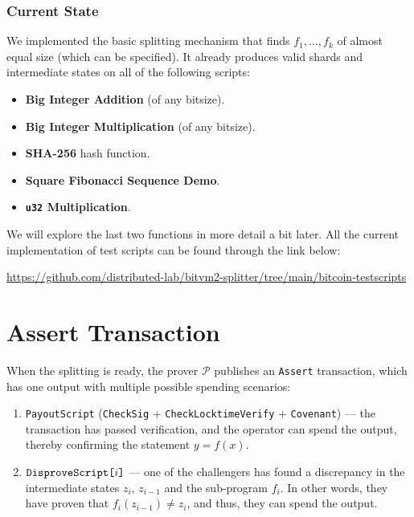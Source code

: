 \documentclass{iacrtrans}
\begin{document}
\subsubsection{Current State}
We implemented the basic splitting mechanism that finds $f_1,\dots,f_k$ of
almost equal size (which can be specified). It already produces valid shards and
intermediate states on all of the following scripts:
\begin{itemize}
  \item \textbf{Big Integer Addition} (of any bitsize).
  \item \textbf{Big Integer Multiplication} (of any bitsize).
  \item \textbf{SHA-256} hash function.
  \item \textbf{Square Fibonacci Sequence Demo}.
  \item \textbf{\texttt{u32} Multiplication}.
\end{itemize}

We will explore the last two functions in more detail a bit later. All the
current implementation of test scripts can be found through the link below:
\begin{center}
  \url{https://github.com/distributed-lab/bitvm2-splitter/tree/main/bitcoin-testscripts}
\end{center}

\section{Assert Transaction}\label{sec:assert-tx}

When the splitting is ready, the prover $\mathcal{P}$ publishes an
\texttt{Assert} transaction, which has one output with multiple
possible spending scenarios:

\begin{enumerate}
  \item \texttt{PayoutScript} (\texttt{CheckSig} +
    \texttt{CheckLocktimeVerify} + \texttt{Covenant}) --- the transaction
    has passed verification, and the operator can spend the output,
    thereby confirming the statement $y=f(x)$.
  \item $\texttt{DisproveScript[\text{$i$}]}$ --- one of the challengers
    has found a discrepancy in the intermediate states \(z_i\),
    \(z_{i-1}\) and the sub-program \(f_i\). In other words, they have
    proven that \(f_i(z_{i-1}) \neq z_i\), and thus, they can spend the
    output.
\end{enumerate}
\end{document}

